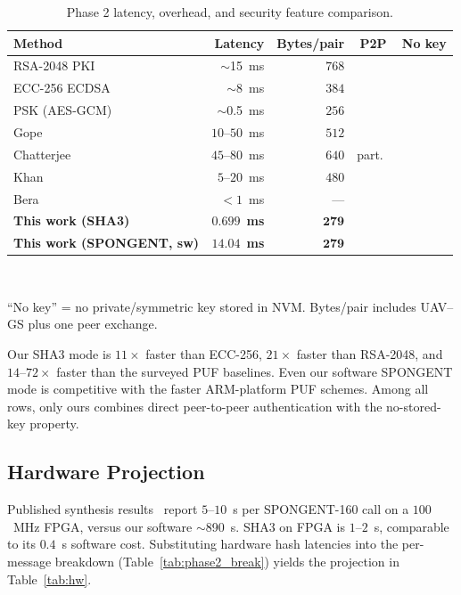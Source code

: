 \documentclass[conference,a4paper,10pt]{IEEEtran}
\newcommand{\xmark}{\ding{55}}
\newcommand{\cmark}{\checkmark}
\begin{document}
\begin{table}[t]
\centering
\caption{Phase 2 latency, overhead, and security feature comparison.}
\label{tab:compare}
\scriptsize
\setlength{\tabcolsep}{4pt}
\begin{tabular}{@{}lrrcc@{}}
\toprule
\textbf{Method} & \textbf{Latency} & \textbf{Bytes/pair}
& \textbf{P2P} & \textbf{No key} \\
\midrule
RSA-2048 PKI                                  & $\sim$15~ms       & $768$ & \cmark & \xmark \\
ECC-256 ECDSA                                 & $\sim$8~ms        & $384$ & \cmark & \xmark \\
PSK (AES-GCM)                                 & $\sim$0.5~ms      & $256$ & \cmark & \xmark \\
Gope \cite{puf_lightweight_uav}               & $10$--$50$~ms     & $512$ & \xmark & \cmark \\
Chatterjee \cite{puf_uav_cross_domain}        & $45$--$80$~ms     & $640$ & part.\ & \cmark \\
Khan \cite{puf_6g_uav}                        & $5$--$20$~ms      & $480$ & \xmark & \cmark \\
Bera \cite{peer2peer_auth}                    & $<\!1$~ms         & ---   & \cmark & \xmark \\
\textbf{This work (SHA3)}                     & $\mathbf{0.699}$~\textbf{ms} & $\mathbf{279}$ & \cmark & \cmark \\
\textbf{This work (SPONGENT, sw)}             & $\mathbf{14.04}$~\textbf{ms} & $\mathbf{279}$ & \cmark & \cmark \\
\bottomrule
\end{tabular}
\\\raggedright\scriptsize ``No key'' = no private/symmetric key
stored in NVM. Bytes/pair includes UAV--GS plus one peer exchange.
\normalsize
\end{table}

Our SHA3 mode is $11\times$ faster than ECC-256, $21\times$ faster
than RSA-2048, and $14$--$72\times$ faster than the surveyed PUF
baselines. Even our software SPONGENT mode is competitive with the
faster ARM-platform PUF schemes. Among all rows, only ours combines
direct peer-to-peer authentication with the no-stored-key property.

\subsection{Hardware Projection}
\label{sec:hwproj}
Published synthesis results~\cite{spongent_original,
lightweight_crypto_evaluation} report $5$--$10$~\textmu s per
SPONGENT-160 call on a $100$~MHz FPGA, versus our software
$\sim$890~\textmu s. SHA3 on FPGA is $1$--$2$~\textmu s, comparable
to its $0.4$~\textmu s software cost. Substituting hardware hash
latencies into the per-message breakdown
(Table~\ref{tab:phase2_break}) yields the projection in
Table~\ref{tab:hw}.
\end{document}
